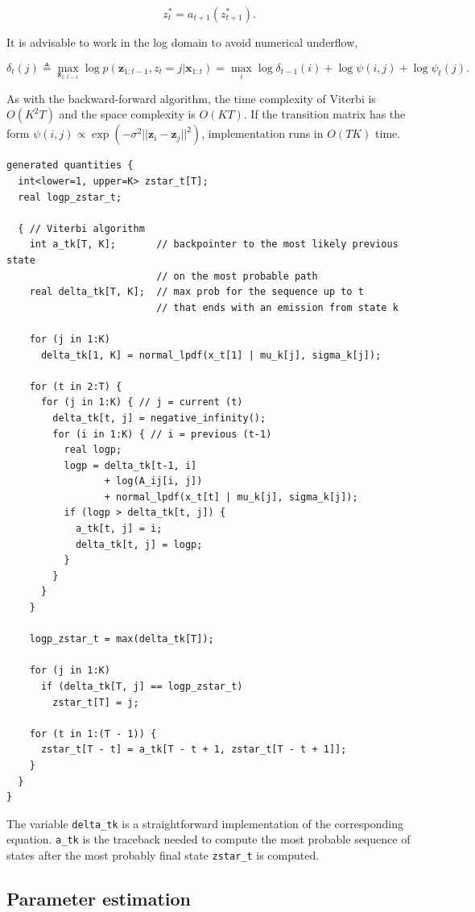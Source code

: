 \documentclass[]{article}
\newcommand{\mat}[1]{\mathbf{#1}}
\begin{document}
\[
z_t^* = a_{t+1}(z_{t+1}^*).
\]

It is advisable to work in the log domain to avoid numerical underflow,

\[
\delta_t(j)
  \triangleq \max_{\mat{z}_{1:t-1}} \log p(\mat{z}_{1:t-1}, z_t = j | \mat{x}_{1:t})
  = \max_{i} \log \delta_{t-1}(i) + \log \psi(i, j) + \log \psi_t(j).
\]

As with the backward-forward algorithm, the time complexity of Viterbi
is \(O(K^2T)\) and the space complexity is \(O(KT)\). If the transition
matrix has the form
\(\psi(i, j) \propto \exp(-\sigma^2 ||\mat{z}_i - \mat{z}_j||^2)\),
implementation runs in \(O(TK)\) time.

\begin{verbatim}
generated quantities {
  int<lower=1, upper=K> zstar_t[T];
  real logp_zstar_t;

  { // Viterbi algorithm
    int a_tk[T, K];       // backpointer to the most likely previous state 
                          // on the most probable path
    real delta_tk[T, K];  // max prob for the sequence up to t
                          // that ends with an emission from state k

    for (j in 1:K)
      delta_tk[1, K] = normal_lpdf(x_t[1] | mu_k[j], sigma_k[j]);

    for (t in 2:T) {
      for (j in 1:K) { // j = current (t)
        delta_tk[t, j] = negative_infinity();
        for (i in 1:K) { // i = previous (t-1)
          real logp;
          logp = delta_tk[t-1, i] 
                 + log(A_ij[i, j]) 
                 + normal_lpdf(x_t[t] | mu_k[j], sigma_k[j]);
          if (logp > delta_tk[t, j]) {
            a_tk[t, j] = i;
            delta_tk[t, j] = logp;
          }
        }
      }
    }

    logp_zstar_t = max(delta_tk[T]);

    for (j in 1:K)
      if (delta_tk[T, j] == logp_zstar_t)
        zstar_t[T] = j;

    for (t in 1:(T - 1)) {
      zstar_t[T - t] = a_tk[T - t + 1, zstar_t[T - t + 1]];
    }
  }
}
\end{verbatim}

The variable \texttt{delta\_tk} is a straightforward implementation of
the corresponding equation. \texttt{a\_tk} is the traceback needed to
compute the most probable sequence of states after the most probably
final state \texttt{zstar\_t} is computed.

\subsection{Parameter estimation}\label{parameter-estimation}
\end{document}
